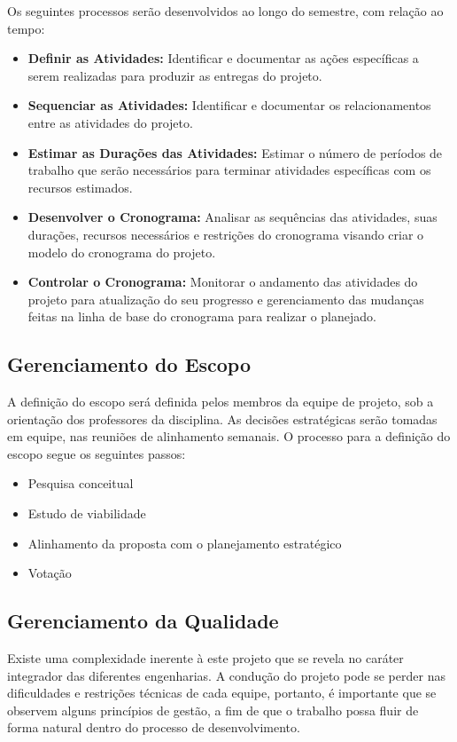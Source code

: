 Os seguintes processos serão desenvolvidos ao longo do semestre, com relação ao tempo:

\begin{itemize}
    \item \textbf{Definir as Atividades:} Identificar e documentar as ações específicas a serem realizadas para produzir as entregas do projeto.
    \item \textbf{Sequenciar as Atividades:} Identificar e documentar os relacionamentos entre as atividades do projeto.
    \item \textbf{Estimar as Durações das Atividades:} Estimar o número de períodos de trabalho que serão necessários para terminar atividades específicas com os recursos estimados.
    \item \textbf{Desenvolver o Cronograma:} Analisar as sequências das atividades, suas durações, recursos necessários e restrições do cronograma visando criar o modelo do cronograma do projeto.
    \item \textbf{Controlar o Cronograma:} Monitorar o andamento das atividades do projeto para atualização do seu progresso e gerenciamento das mudanças feitas na linha de base do cronograma para realizar o planejado.
\end{itemize}

\subsection{Gerenciamento do Escopo}

A definição do escopo será definida pelos membros da equipe de projeto, sob a orientação dos professores da disciplina. As decisões estratégicas serão tomadas em equipe, nas reuniões de alinhamento semanais. O processo para a definição do escopo segue os seguintes passos:

\begin{itemize}
    \item Pesquisa conceitual
    \item Estudo de viabilidade
    \item Alinhamento da proposta com o planejamento estratégico
    \item Votação
\end{itemize}

\subsection{Gerenciamento da Qualidade}
Existe uma complexidade inerente à este projeto que se revela no caráter integrador das diferentes engenharias. A condução do projeto pode se perder nas dificuldades e restrições técnicas de cada equipe, portanto, é importante que se observem alguns princípios de gestão, a fim de que o trabalho possa fluir de forma natural dentro do processo de desenvolvimento.

